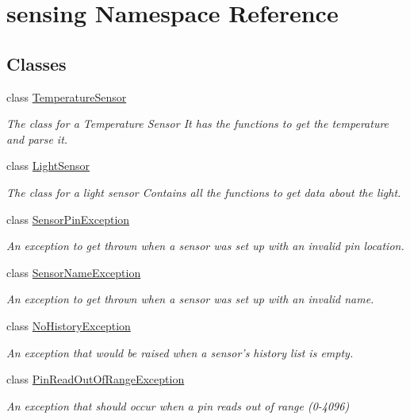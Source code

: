 \hypertarget{namespacesensing}{\section{sensing Namespace Reference}
\label{namespacesensing}
}
\subsection*{Classes}
\begin{DoxyCompactItemize}
\item 
class \hyperlink{classsensing_1_1_temperature_sensor}{Temperature\-Sensor}
\begin{DoxyCompactList}\small\item\em The class for a Temperature Sensor It has the functions to get the temperature and parse it. \end{DoxyCompactList}\item 
class \hyperlink{classsensing_1_1_light_sensor}{Light\-Sensor}
\begin{DoxyCompactList}\small\item\em The class for a light sensor Contains all the functions to get data about the light. \end{DoxyCompactList}\item 
class \hyperlink{classsensing_1_1_sensor_pin_exception}{Sensor\-Pin\-Exception}
\begin{DoxyCompactList}\small\item\em An exception to get thrown when a sensor was set up with an invalid pin location. \end{DoxyCompactList}\item 
class \hyperlink{classsensing_1_1_sensor_name_exception}{Sensor\-Name\-Exception}
\begin{DoxyCompactList}\small\item\em An exception to get thrown when a sensor was set up with an invalid name. \end{DoxyCompactList}\item 
class \hyperlink{classsensing_1_1_no_history_exception}{No\-History\-Exception}
\begin{DoxyCompactList}\small\item\em An exception that would be raised when a sensor's history list is empty. \end{DoxyCompactList}\item 
class \hyperlink{classsensing_1_1_pin_read_out_of_range_exception}{Pin\-Read\-Out\-Of\-Range\-Exception}
\begin{DoxyCompactList}\small\item\em An exception that should occur when a pin reads out of range (0-\/4096) \end{DoxyCompactList}\end{DoxyCompactItemize}
